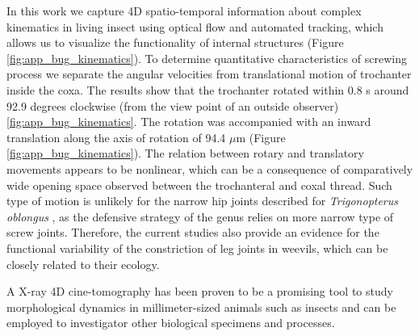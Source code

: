 In this work we capture 4D spatio-temporal information about complex kinematics in living insect using optical flow and automated tracking, which allows us to visualize the functionality of internal structures (Figure \ref{fig:app_bug_kinematics}). To determine quantitative characteristics of screwing process we separate the angular velocities from translational motion of trochanter inside the coxa. 
The results show that the trochanter rotated within 0.8 s around 92.9 degrees clockwise (from the view point of
an outside observer) \ref{fig:app_bug_kinematics}. The rotation was accompanied with an inward translation along the axis of
rotation of 94.4 $\mu$m (Figure \ref{fig:app_bug_kinematics}). The relation between rotary and translatory movements appears to be nonlinear,
which can be a consequence of comparatively wide opening space observed between the trochanteral
and coxal thread. Such type of motion is unlikely for the narrow hip
joints described for \textit{Trigonopterus oblongus} \cite{vandeKamp11}, as the defensive strategy of the genus relies on
more narrow type of screw joints. Therefore, the current studies also provide an evidence for the functional
variability of the constriction of leg joints in weevils, which can be closely related to their ecology.

A X-ray 4D cine-tomography has been proven to be a promising tool to
study morphological dynamics in millimeter-sized animals such as insects and can be employed to investigator other biological
specimens and processes.





%



